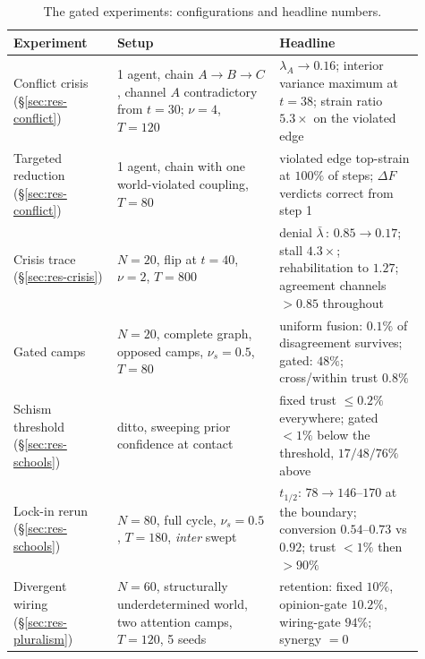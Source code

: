 \documentclass[runningheads]{llncs}
\begin{document}
\begin{table}[h!]
\centering\footnotesize
\begin{tabular}{p{0.23\linewidth}p{0.36\linewidth}p{0.32\linewidth}}
\hline
Experiment & Setup & Headline \\
\hline
Conflict crisis (\S\ref{sec:res-conflict}) & 1 agent, chain $A{\to}B{\to}C$, channel $A$
contradictory from $t{=}30$; $\nu{=}4$, $T{=}120$ & $\lambda_A\!\to\!0.16$; interior variance
maximum at $t{=}38$; strain ratio $5.3{\times}$ on the violated edge \\[2pt]
Targeted reduction (\S\ref{sec:res-conflict}) & 1 agent, chain with one world-violated coupling,
$T{=}80$ & violated edge top-strain at $100\%$ of steps; $\Delta F$ verdicts correct from step
1 \\[2pt]
Crisis trace (\S\ref{sec:res-crisis}) & $N{=}20$, flip at $t{=}40$, $\nu{=}2$, $T{=}800$ &
denial $\bar\lambda\,{:}\,0.85\!\to\!0.17$; stall $4.3{\times}$; rehabilitation to $1.27$;
agreement channels $>0.85$ throughout \\[2pt]
Gated camps & $N{=}20$, complete graph, opposed camps, $\nu_s{=}0.5$, $T{=}80$ & uniform fusion:
$0.1\%$ of disagreement survives; gated: $48\%$; cross/within trust $0.8\%$ \\[2pt]
Schism threshold (\S\ref{sec:res-schools}) & ditto, sweeping prior confidence at contact &
fixed trust $\le0.2\%$ everywhere; gated $<1\%$ below the threshold, $17/48/76\%$ above \\[2pt]
Lock-in rerun (\S\ref{sec:res-schools}) & $N{=}80$, full cycle, $\nu_s{=}0.5$, $T{=}180$,
\emph{inter} swept & $t_{1/2}$: $78\!\to\!146$--$170$ at the boundary; conversion $0.54$--$0.73$
vs $0.92$; trust $<1\%$ then $>90\%$ \\[2pt]
Divergent wiring (\S\ref{sec:res-pluralism}) & $N{=}60$, structurally underdetermined world, two
attention camps, $T{=}120$, 5 seeds & retention: fixed $10\%$, opinion-gate $10.2\%$,
wiring-gate $94\%$; synergy $=0$ \\
\hline
\end{tabular}
\caption{The gated experiments: configurations and headline numbers.}
\label{tab:rel-experiments}
\end{table}
\end{document}
